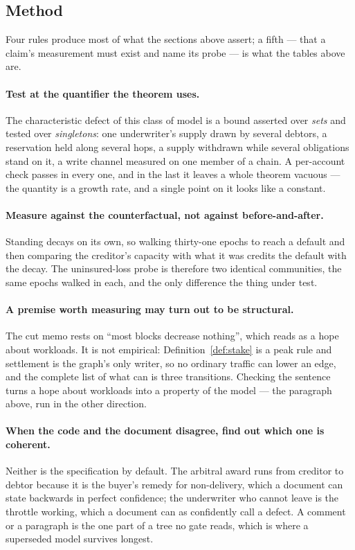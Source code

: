 \subsection{Method}

Four rules produce most of what the sections above assert; a fifth --- that a claim's
measurement must exist and name its probe --- is what the tables above are.

\paragraph{Test at the quantifier the theorem uses.} The characteristic defect of this
class of model is a bound asserted over \emph{sets} and tested over \emph{singletons}:
one underwriter's supply drawn by several debtors, a reservation held along several
hops, a supply withdrawn while several obligations stand on it, a write channel measured
on one member of a chain. A per-account check passes in every one, and in the last it
leaves a whole theorem vacuous --- the quantity is a growth rate, and a single point on it
looks like a constant.

\paragraph{Measure against the counterfactual, not against before-and-after.} Standing
decays on its own, so walking thirty-one epochs to reach a default and then comparing
the creditor's capacity with what it was credits the default with the decay. The
uninsured-loss probe is therefore two identical communities, the same epochs walked in
each, and the only difference the thing under test.

\paragraph{A premise worth measuring may turn out to be structural.} The cut memo rests
on ``most blocks decrease nothing'', which reads as a hope about workloads. It is not
empirical: Definition~\ref{def:stake} is a peak rule and settlement is the graph's only
writer, so no ordinary traffic can lower an edge, and the complete list of what can is
three transitions. Checking the sentence turns a hope about workloads into a property of
the model --- the paragraph above, run in the other direction.

\paragraph{When the code and the document disagree, find out which one is coherent.}
Neither is the specification by default. The arbitral award runs from creditor to debtor
because it is the buyer's remedy for non-delivery, which a document can state backwards
in perfect confidence; the underwriter who cannot leave is the throttle working, which a
document can as confidently call a defect. A comment or a paragraph is the one part of a
tree no gate reads, which is where a superseded model survives longest.
